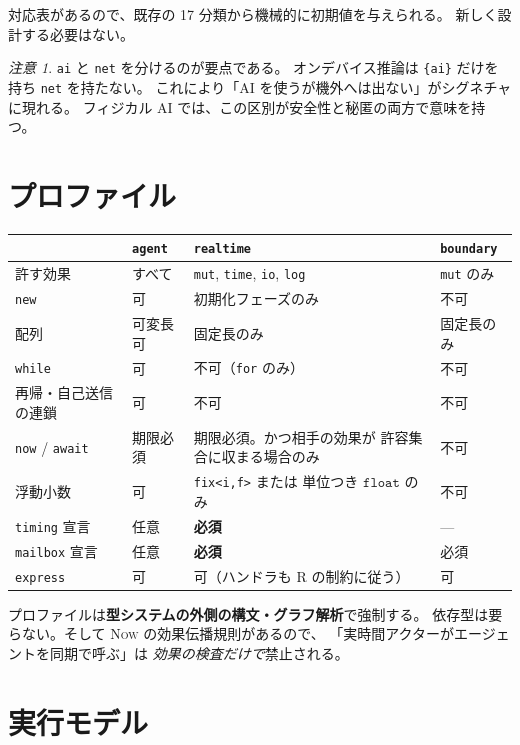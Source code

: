 \documentclass[11pt,a4paper]{ltjsarticle}
\theoremstyle{remark}
\newtheorem{remark}{注意}
\newcommand{\ty}[1]{\ensuremath{\mathtt{#1}}}
\begin{document}
対応表があるので、既存の 17 分類から機械的に初期値を与えられる。
新しく設計する必要はない。

\begin{remark}
\texttt{ai} と \texttt{net} を分けるのが要点である。
オンデバイス推論は \texttt{\{ai\}} だけを持ち \texttt{net} を持たない。
これにより「AI を使うが機外へは出ない」がシグネチャに現れる。
フィジカル AI では、この区別が安全性と秘匿の両方で意味を持つ。
\end{remark}

\section{プロファイル}

\begin{center}
\small
\begin{tabular}{@{}lp{3.9cm}p{3.9cm}p{2.4cm}@{}}
\toprule
 & \texttt{agent} & \texttt{realtime} & \texttt{boundary} \\
\midrule
許す効果 &
  すべて &
  \texttt{mut}, \texttt{time}, \texttt{io}, \texttt{log} &
  \texttt{mut} のみ \\
\texttt{new} &
  可 & 初期化フェーズのみ & 不可 \\
配列 &
  可変長可 & 固定長のみ & 固定長のみ \\
\texttt{while} &
  可 & 不可（\texttt{for} のみ）& 不可 \\
再帰・自己送信の連鎖 &
  可 & 不可 & 不可 \\
\texttt{now} / \texttt{await} &
  期限必須 & 期限必須。かつ相手の効果が
  許容集合に収まる場合のみ & 不可 \\
浮動小数 &
  可 & \texttt{fix<i,f>} または
  単位つき \ty{float} のみ & 不可 \\
\texttt{timing} 宣言 &
  任意 & \textbf{必須} & --- \\
\texttt{mailbox} 宣言 &
  任意 & \textbf{必須} & 必須 \\
\texttt{express} &
  可 & 可（ハンドラも R の制約に従う）& 可 \\
\bottomrule
\end{tabular}
\end{center}

プロファイルは\textbf{型システムの外側の構文・グラフ解析}で強制する。
依存型は要らない。そして \textsc{Now} の効果伝播規則があるので、
「実時間アクターがエージェントを同期で呼ぶ」は
\emph{効果の検査だけで}禁止される。

\section{実行モデル}
\end{document}
